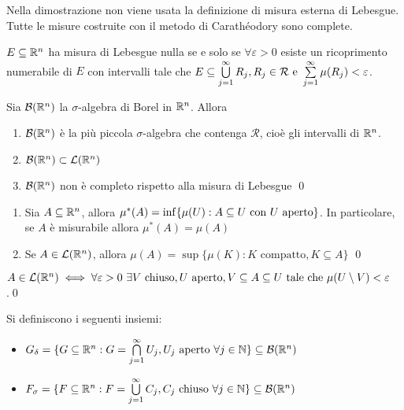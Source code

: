 \begin{remark}
	Nella dimostrazione non viene usata la definizione di misura esterna di Lebesgue. Tutte le misure costruite con il metodo di Carathéodory sono complete.
\end{remark}

\begin{definition}
	$E \subseteq \mathbb{R}^n$ ha misura di Lebesgue nulla se e solo se $\forall \varepsilon > 0$ esiste un ricoprimento numerabile di $E$ con intervalli tale che $E \subseteq \bigcup\limits_{j=1}^\infty R_j, R_j \in \mathcal{R} \text{ e } \sum\limits_{j=1}^\infty \mu(R_j)<\varepsilon$.
\end{definition}

\begin{theorem}
	Sia $\mathcal{B}(\mathbb{R}^n)$ la $\sigma$-algebra di Borel in $\mathbb{R}^n$. Allora
	\begin{enumerate}
		\item $\mathcal{B}(\mathbb{R}^n)$ è la più piccola $\sigma$-algebra che contenga $\mathcal{R}$, cioè gli intervalli di $\mathbb{R}^n$.
		\item $\mathcal{B}(\mathbb{R}^n)\subset \mathcal{L}(\mathbb{R}^n)$
		\item $\mathcal{B}(\mathbb{R}^n)$ non è completo rispetto alla misura di Lebesgue
		\qed
	\end{enumerate}
\end{theorem}

\begin{theorem}\leavevmode
	\begin{enumerate}
		\item Sia $A\subseteq\mathbb{R}^n$, allora $\mu^*(A)=\inf\{\mu(U):A\subseteq U \text{ con } U \text{ aperto}\}$. In particolare, se $A$ è misurabile allora $\mu^*(A)=\mu(A)$
		\item Se $A \in \mathcal{L}(\mathbb{R}^n)$, allora $\mu(A)=\sup\{\mu(K):K \text{ compatto}, K \subseteq A\}$
		\qed
	\end{enumerate}
\end{theorem}

\begin{corollary}
	$A \in \mathcal{L}(\mathbb{R}^n) \iff \forall \varepsilon > 0 \ \exists V \text{ chiuso}, U \text{ aperto}, V \subseteq A \subseteq U \text{ tale che } \mu(U\setminus V) < \varepsilon$.\qed
\end{corollary}

\begin{definition}
	Si definiscono i seguenti insiemi:
	\begin{itemize}
		\item $G_\delta = \{G \subseteq \mathbb{R}^n:G=\bigcap\limits_{j=1}^\infty U_j, U_j \text{ aperto } \forall j \in \mathbb{N}\} \subseteq \mathcal{B}(\mathbb{R}^n)$
		\item $F_\sigma = \{F \subseteq \mathbb{R}^n:F=\bigcup\limits_{j=1}^\infty C_j, C_j \text{ chiuso } \forall j \in \mathbb{N}\} \subseteq \mathcal{B}(\mathbb{R}^n)$
	\end{itemize}
\end{definition}

